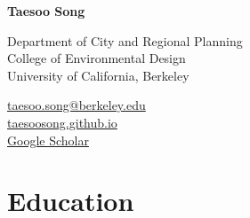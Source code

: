 \documentclass[12pt,letterpaper]{report}
\newcommand{\myname}{Taesoo Song}
\newcommand{\namefont}[1]{{\normalfont\bfseries\Huge{#1}}}
\begin{document}
    \raggedright{}

    \namefont{\myname}

    \vspace{1em}
    \begin{minipage}[t]{0.695\textwidth}
        Department of City and Regional Planning\\
        College of Environmental Design\\
        University of California, Berkeley
    \end{minipage}
    \begin{minipage}[t]{0.300\textwidth}
        \flushright{}
        \href{mailto:taesoo.song@berkeley.edu}{taesoo.song@berkeley.edu} \\
        \href{https://taesoosong.github.io}{taesoosong.github.io}\\
        \href{https://scholar.google.com/citations?user=xM5Rc-EAAAAJ&hl=en}{Google Scholar}\\
    \end{minipage}

    \section*{Education}
    
\end{document}
